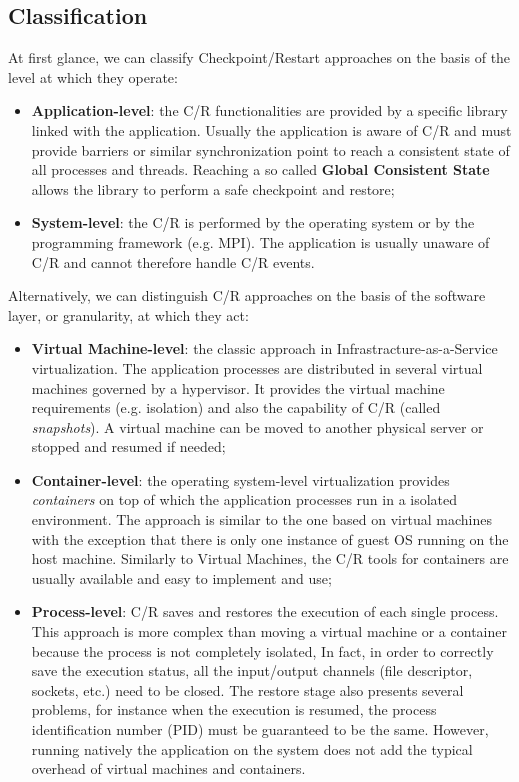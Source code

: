 \subsection{Classification}
At first glance, we can classify
Checkpoint/Restart approaches on the basis of the level at which they operate:

\begin{itemize}
	\item \textbf{Application-level}: the C/R functionalities are provided by
	a specific library linked with the application. Usually the
	application is aware of C/R and must provide barriers or similar
	synchronization point to reach a consistent state of all
	processes and threads. Reaching a so called
	\textbf{Global Consistent State} allows the
	library to perform a safe checkpoint and restore;
	\item \textbf{System-level}: the C/R is performed by the operating
	system or by the programming framework (e.g. MPI). The application 
	is usually unaware of C/R and cannot therefore handle C/R events.
\end{itemize}

Alternatively, we can distinguish C/R approaches on the basis of the software
layer, or granularity, at which they act:

\begin{itemize}
	\item \textbf{Virtual Machine-level}: the classic approach in
	Infrastracture-as-a-Service virtualization. The application
	processes are distributed in several virtual machines governed by
	a hypervisor. It provides the virtual machine requirements
	(e.g. isolation) and also the capability of C/R (called 
	\emph{snapshots}). A
	virtual machine can be moved to another physical server or stopped
	and resumed if needed;
	\item \textbf{Container-level}: the operating system-level
	virtualization provides \emph{containers} on top of which the application
	processes run in a isolated environment. The approach is similar to
	the one based on virtual machines with the exception that there is only one
    instance of guest OS running on the host machine.
	Similarly to Virtual Machines, the C/R tools for containers
	are usually available and easy to implement and use;
	\item \textbf{Process-level}: C/R saves and restores the execution of each
    single process.
	This approach is more complex than moving a virtual machine or a
	container because the process is not completely isolated, In fact, in order
    to correctly save the execution status,
	all the input/output channels (file descriptor, sockets,
	etc.) need to be closed. The restore stage also presents several problems,
    for instance when the execution is resumed, the process identification number
    (PID) must be guaranteed to be the same. However, running
	natively the application on the system does not add the typical
	overhead of virtual machines and containers.
\end{itemize}


